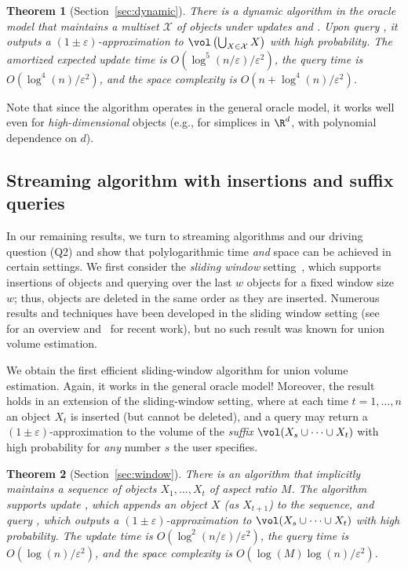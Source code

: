 \documentclass[a4paper, 11pt]{article}
\newtheorem{theorem}{Theorem}[section]
\newcommand{\eps}{\varepsilon}
\newcommand{\class}[1]{\mathcal{#1}}
\begin{document}
\begin{theorem}[Section~\ref{sec:dynamic}]
\label{thm:dynamicalgo}%
There is a dynamic algorithm in the oracle model that maintains a multiset $\class{X}$ of objects under updates  and . Upon query \est{}, it outputs a $(1\pm\eps)$-approximation to $\vol\left(\bigcup_{X \in \class{X}} X\right)$ with high probability. The amortized expected update time is $O(\log^5(n/\eps)/\eps^2)$, the query time is $O(\log^4(n)/\eps^2)$, and the space complexity is $O(n + \log^4(n)/\eps^2)$.
\end{theorem}

Note that since the algorithm operates in the general oracle model, it works well even for \emph{high-dimensional} objects (e.g., for simplices in $\R^d$, with polynomial dependence on $d$).


\subsection{Streaming algorithm with insertions and suffix queries}

In our remaining results, we turn to streaming algorithms and our driving question (Q2) and show that polylogarithmic time \emph{and} space can be achieved in certain settings. 
We first consider the \emph{sliding window} setting~\cite{datar2002maintaining}, which supports insertions of objects and querying over the last $w$ objects for a fixed window size $w$;
thus, objects are deleted in the same order as they are inserted. Numerous results and techniques have been developed in the sliding window setting (see~\cite{muthukrishnan2005data,babcock2002models,Braverman16} for an overview and~\cite{woodruff2022tight,JayaramWZ22,FengSW25} for recent work), but no such result was known for union volume estimation.

We obtain the first efficient sliding-window algorithm for union volume estimation. Again, it
works in the general oracle model! Moreover, the result holds in an extension of the sliding-window setting, where at each time $t = 1, \dots, n$ an object $X_t$ is inserted (but cannot be deleted), and a query  may return a $(1\pm\eps)$-approximation to the volume of the \emph{suffix} $\vol(X_s \cup \cdots \cup X_t)$ with high probability for \emph{any} number $s$ the user specifies. 

\begin{theorem}[Section~\ref{sec:window}]
\label{thm:windowalgo}%
There is an algorithm that implicitly maintains a sequence of objects $X_1, \dots, X_t$ of aspect ratio $M$. The algorithm supports update , which appends an object $X$ (as $X_{t+1}$) to the sequence, and query , which outputs a $(1\pm\eps)$-approximation to $\vol(X_s \cup \cdots \cup X_t)$ with high probability. The update time is $O(\log^2(n/\eps)/\eps^2)$, the query time is $O(\log(n)/\eps^2)$, and the space complexity is $O(\log(M) \log(n)/\eps^2)$.
\end{theorem}
\end{document}
